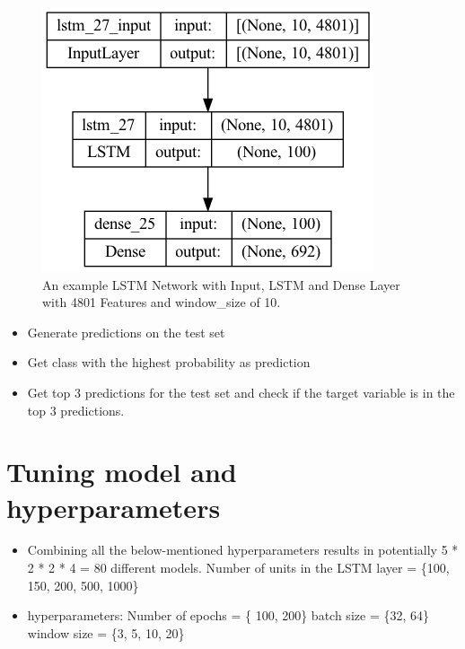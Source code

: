 \begin{figure}[h!]
    \centering
    \includegraphics[scale=0.5]{images/model_plot.png}
    \caption{An example LSTM Network with Input, LSTM and Dense Layer with 4801 Features and window\_size of 10.}
    \label{fig:lstm_architecture}
\end{figure}

\begin{itemize}
    \item Generate predictions on the test set
    \item Get class with the highest probability as prediction
    \item Get top 3 predictions for the test set and check if the target variable is in the top 3 predictions.
\end{itemize}

\section{Tuning model and hyperparameters}
\begin{itemize}
    \item Combining all the below-mentioned hyperparameters results in potentially 5 * 2 * 2 * 4 = 80 different models. %
    \subitem Number of units in the LSTM layer = \{100, 150, 200, 500, 1000\}
    \item hyperparameters:
    \subitem Number of epochs = \{ 100, 200\}
    \subitem batch size = \{32, 64\}
    \subitem window size = \{3, 5, 10, 20\}
\end{itemize}
